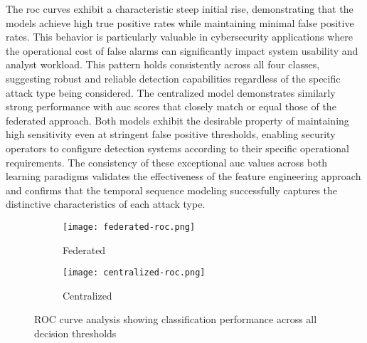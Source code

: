 The \gls{roc} curves exhibit a characteristic steep initial rise, demonstrating that the models achieve high true positive rates while maintaining minimal false positive rates. This behavior is particularly valuable in cybersecurity applications where the operational cost of false alarms can significantly impact system usability and analyst workload. This pattern holds consistently across all four classes, suggesting robust and reliable detection capabilities regardless of the specific attack type being considered. The centralized model demonstrates similarly strong performance with \gls{auc} scores that closely match or equal those of the federated approach. Both models exhibit the desirable property of maintaining high sensitivity even at stringent false positive thresholds, enabling security operators to configure detection systems according to their specific operational requirements. The consistency of these exceptional \gls{auc} values across both learning paradigms validates the effectiveness of the feature engineering approach and confirms that the temporal sequence modeling successfully captures the distinctive characteristics of each attack type. %

\begin{figure}[H]
	\centering
	\begin{subfigure}[b]{0.45\textwidth}
		\centering
		\texttt{[image: federated-roc.png]}
		\caption{Federated}
		\label{figure:federated-roc}
	\end{subfigure}
	\hspace{0.25cm} 
	\begin{subfigure}[b]{0.45\textwidth}
		\centering
		\texttt{[image: centralized-roc.png]}
		\caption{Centralized}
		\label{figure:centralized-roc}
	\end{subfigure}
	\caption{ROC curve analysis showing classification performance across all decision thresholds}
	\label{figure:roc}
\end{figure}



